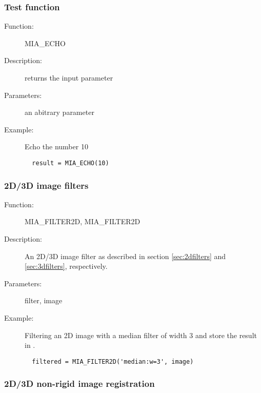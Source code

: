 \subsubsection*{Test function}

\begin{description}
\item [Function:] MIA\_ECHO
\item [Description:] returns the input parameter
\item [Parameters:] an abitrary parameter 
\item [Example:] Echo the number 10 
\begin{lstlisting}
  result = MIA_ECHO(10)
\end{lstlisting}
\end{description}

\subsubsection*{2D/3D image filters}

\begin{description}
\item [Function:] MIA\_FILTER2D, MIA\_FILTER2D
\item [Description:] An 2D/3D image filter as described in section \ref{sec:2dfilters} and \ref{sec:3dfilters}, respectively.
\item [Parameters:] filter, image
\item [Example:] Filtering an 2D image  with a median filter of width 3 and store the result in .
\begin{lstlisting}
  filtered = MIA_FILTER2D('median:w=3', image)
\end{lstlisting}
\end{description}

\subsubsection*{2D/3D non-rigid image registration}

